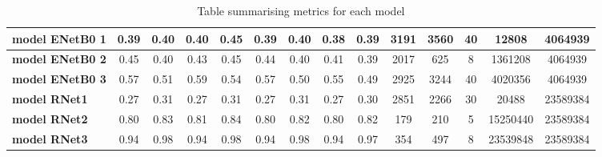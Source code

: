 \begin{table}[ht]
{\begin{tabular}{l|cc|cc|cc|cc|cc|ccc}
\multicolumn{1}{|l|}{\cellcolor[HTML]{EFEFEF}\textbf{model ENetB0 1}} & \multicolumn{1}{c|}{0.39} & 0.40 & \multicolumn{1}{c|}{0.40} & 0.45 & \multicolumn{1}{c|}{0.39} & 0.40 & \multicolumn{1}{c|}{0.38} & 0.39 & \multicolumn{1}{c|}{3191} & 3560 & \multicolumn{1}{c|}{40} & \multicolumn{1}{c|}{12808} & \multicolumn{1}{c|}{4064939} \\ \hline
\multicolumn{1}{|l|}{\cellcolor[HTML]{EFEFEF}\textbf{model ENetB0 2}} & \multicolumn{1}{c|}{0.45} & 0.40 & \multicolumn{1}{c|}{0.43} & 0.45 & \multicolumn{1}{c|}{0.44} & 0.40 & \multicolumn{1}{c|}{0.41} & 0.39 & \multicolumn{1}{c|}{2017} & 625 & \multicolumn{1}{c|}{8} & \multicolumn{1}{c|}{1361208} & \multicolumn{1}{c|}{4064939} \\ \hline
\multicolumn{1}{|l|}{\cellcolor[HTML]{EFEFEF}\textbf{model ENetB0 3}} & \multicolumn{1}{c|}{0.57} & 0.51 & \multicolumn{1}{c|}{0.59} & 0.54 & \multicolumn{1}{c|}{0.57} & 0.50 & \multicolumn{1}{c|}{0.55} & 0.49 & \multicolumn{1}{c|}{2925} & 3244 & \multicolumn{1}{c|}{40} & \multicolumn{1}{c|}{4020356} & \multicolumn{1}{c|}{4064939} \\ \hline
\multicolumn{1}{|l|}{\cellcolor[HTML]{EFEFEF}\textbf{model RNet1}} & \multicolumn{1}{c|}{0.27} & 0.31 & \multicolumn{1}{c|}{0.27} & 0.31 & \multicolumn{1}{c|}{0.27} & 0.31 & \multicolumn{1}{c|}{0.27} & 0.30 & \multicolumn{1}{c|}{2851} & 2266 & \multicolumn{1}{c|}{30} & \multicolumn{1}{c|}{20488} & \multicolumn{1}{c|}{23589384} \\ \hline
\multicolumn{1}{|l|}{\cellcolor[HTML]{EFEFEF}\textbf{model RNet2}} & \multicolumn{1}{c|}{0.80} & 0.83 & \multicolumn{1}{c|}{0.81} & 0.84 & \multicolumn{1}{c|}{0.80} & 0.82 & \multicolumn{1}{c|}{0.80} & 0.82 & \multicolumn{1}{c|}{179} & 210 & \multicolumn{1}{c|}{5} & \multicolumn{1}{c|}{15250440} & \multicolumn{1}{c|}{23589384} \\ \hline
\multicolumn{1}{|l|}{\cellcolor[HTML]{EFEFEF}\textbf{model RNet3}} & \multicolumn{1}{c|}{0.94} & 0.98 & \multicolumn{1}{c|}{0.94} & 0.98 & \multicolumn{1}{c|}{0.94} & 0.98 & \multicolumn{1}{c|}{0.94} & 0.97 & \multicolumn{1}{c|}{354} & 497 & \multicolumn{1}{c|}{8} & \multicolumn{1}{c|}{23539848} & \multicolumn{1}{c|}{23589384} \\ \hline
\end{tabular}%
}
    \caption{Table summarising metrics for each model}
    \label{tbl: Metrics summary}
\end{table}

